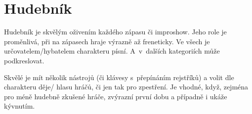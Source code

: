  
 
 
 
\needspace{5cm} \section{Hudebník} \label{hudebník} Hudebník je skvělým oživením každého zápasu či improshow. 
Jeho role je proměnlivá, při  na zápasech hraje výrazně až freneticky. 
Ve všech  je určovatelem/hybatelem charakteru písní. 
A~v~dalších kategoriích může podkreslovat. 
 
Skvělé je mít několik nástrojů (či klávesy s~přepínáním rejstříků) a volit dle charakteru děje/ hlasu hráčů, či jen tak pro zpestření. 
Je vhodné, když, zejména pro méně hudebně zkušené hráče, zvýrazní první dobu a případně i ukáže kývnutím. 
 
